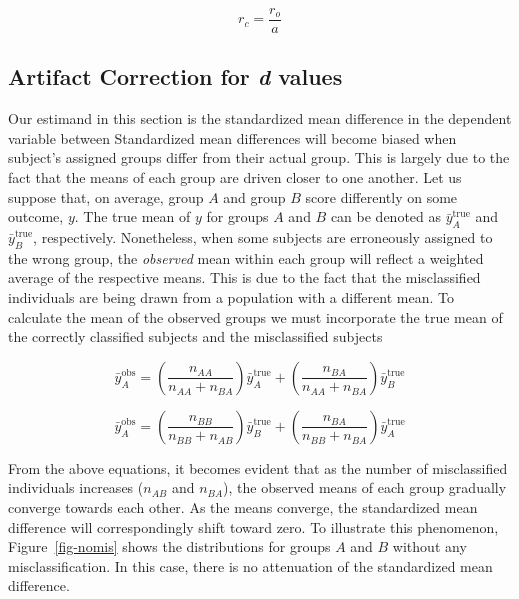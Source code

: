 \documentclass[
  letterpaper,
  DIV=11,
  numbers=noendperiod]{scrreprt}
\begin{document}
\[
r_c = \frac{r_o}{a}
\]

\hypertarget{artifact-correction-for-d-values}{%
\subsection{\texorpdfstring{Artifact Correction for \emph{d}
values}{Artifact Correction for d values}}\label{artifact-correction-for-d-values}}

Our estimand in this section is the standardized mean difference in the
dependent variable between Standardized mean differences will become
biased when subject's assigned groups differ from their actual group.
This is largely due to the fact that the means of each group are driven
closer to one another. Let us suppose that, on average, group \(A\) and
group \(B\) score differently on some outcome, \(y\). The true mean of
\(y\) for groups \(A\) and \(B\) can be denoted as
\(\bar{y}^\text{true}_{A}\) and \(\bar{y}^\text{true}_{B}\),
respectively. Nonetheless, when some subjects are erroneously assigned
to the wrong group, the \emph{observed} mean within each group will
reflect a weighted average of the respective means. This is due to the
fact that the misclassified individuals are being drawn from a
population with a different mean. To calculate the mean of the observed
groups we must incorporate the true mean of the correctly classified
subjects and the misclassified subjects

\[
\bar{y}^\text{obs}_A = \left(\frac{n_{AA}}{n_{AA}+n_{BA}}\right)\bar{y}^\text{true}_A + \left(\frac{n_{BA}}{n_{AA}+n_{BA}}\right)\bar{y}^\text{true}_B
\]

\[
\bar{y}^\text{obs}_A = \left(\frac{n_{BB}}{n_{BB}+n_{AB}}\right)\bar{y}^\text{true}_B + \left(\frac{n_{BA}}{n_{BB}+n_{BA}}\right)\bar{y}^\text{true}_A
\]

From the above equations, it becomes evident that as the number of
misclassified individuals increases (\(n_{AB}\) and \(n_{BA}\)), the
observed means of each group gradually converge towards each other. As
the means converge, the standardized mean difference will
correspondingly shift toward zero. To illustrate this phenomenon,
Figure~\ref{fig-nomis} shows the distributions for groups \(A\) and
\(B\) without any misclassification. In this case, there is no
attenuation of the standardized mean difference.
\end{document}

